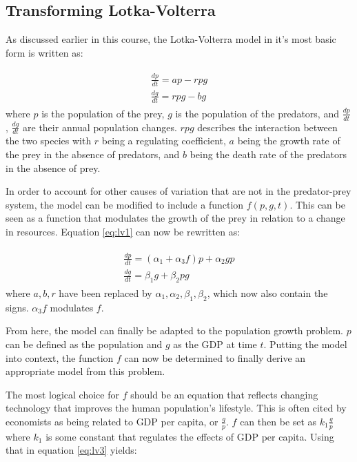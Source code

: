 \documentclass[a4paper]{article}
\begin{document}
\subsection{Transforming Lotka-Volterra}

As discussed earlier in this course, the Lotka-Volterra model in it's most basic form is written as:

\begin{align}
\begin{split}
\label{eq:lv1}
	\frac{dp}{dt} = ap - rpg \\
	\frac{dg}{dt} = rpg - bg
\end{split}
\end{align}
where $p$ is the population of the prey, $g$ is the population of the predators, and $\frac{dp}{dt}$, $\frac{dg}{dt}$ are their annual population changes. $rpg$ describes the interaction between the two species with $r$ being a regulating coefficient, $a$ being the growth rate of the prey in the absence of predators, and $b$ being the death rate of the predators in the absence of prey. 

In order to account for other causes of variation that are not in the predator-prey system, the model can be modified to include a function $f(p, g, t)$. This can be seen as a function that modulates the growth of the prey in relation to a change in resources. Equation \ref{eq:lv1} can now be rewritten as:

\begin{align}
\begin{split}
\label{eq:lv3}
	\frac{dp}{dt} = (\alpha_1 + \alpha_3 f)p + \alpha_2 g p \\
	\frac{dg}{dt} = \beta_1 g + \beta_2 p g
\end{split}
\end{align}
where $a, b, r$ have been replaced by $\alpha_1, \alpha_2, \beta_1, \beta_2$, which now also contain the signs. $\alpha_3f$ modulates $f$.

From here, the model can finally be adapted to the population growth problem. $p$ can be defined as the population and $g$ as the GDP at time $t$. Putting the model into context, the function $f$ can now be determined to finally derive an appropriate model from this problem.

The most logical choice for $f$ should be an equation that reflects changing technology that improves the human population's lifestyle. This is often cited by economists as being related to GDP per capita, or $\frac{g}{p}$. $f$ can then be set as $k_1 \frac{g}{p}$ where $k_1$ is some constant that regulates the effects of GDP per capita. Using that in equation \ref{eq:lv3} yields:
\end{document}
